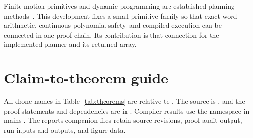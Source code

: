 \documentclass[11pt]{article}
\begin{document}
Finite motion primitives and dynamic programming are established planning methods~\cite{lavalle}.  This development fixes a small primitive family so that exact word arithmetic, continuous polynomial safety, and compiled execution can be connected in one proof chain.  Its contribution is that connection for the implemented planner and its returned array.

\appendix
\section{Claim-to-theorem guide}

All drone names in Table~\ref{tab:theorems} are relative to .  The source is , and the proof statements and dependencies are in .  Compiler results use the  namespace in main\textquotesingle s .  The report\textquotesingle s companion files retain source revisions, proof-audit output, run inputs and outputs, and figure data.
\end{document}
